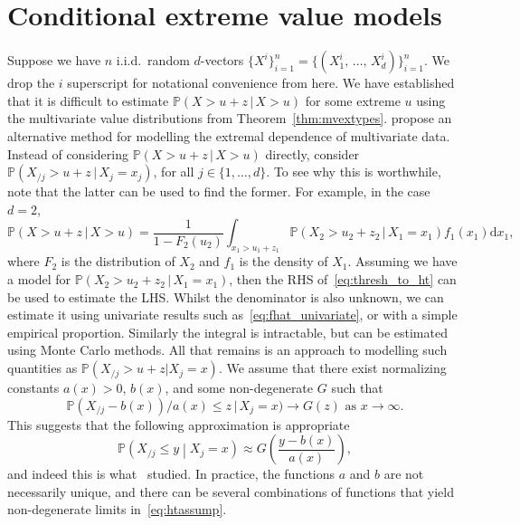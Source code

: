 \documentclass[11pt,twoside,openany]{book}
\newcommand{\prob}{\mathbb{P}}
\newcommand{\md}{\mathrm{d}}
\numberwithin{Theorem}{chapter}
\numberwithin{Definition}{chapter}
\numberwithin{Lemma}{chapter}
\numberwithin{Algorithm}{chapter}
\numberwithin{equation}{chapter}
\begin{document}
\section{Conditional extreme value models}

Suppose we have $n$ i.i.d.\ random $d$-vectors
$\{X^i\}_{i=1}^n = \{(X^i_1,\,\ldots,\,X^i_d)\}_{i=1}^n$.
We drop the $i$ superscript for notational convenience from here. We have
established that it is difficult to estimate $\prob(X > u + z\,|\,X > u)$
for some extreme $u$ using the multivariate value distributions from
Theorem~\ref{thm:mvextypes}. \cite{heffernan2004conditional} propose an
alternative method for modelling the extremal dependence of multivariate data.
Instead of considering $\prob(X> u + z\, |\, X > u)$ directly, consider
$\prob(X_{/j} > u + z\, |\, X_j = x_j)$, for all $j\in \{1,\ldots,d\}$.
To see why this is worthwhile, note that
the latter can be used to find the former. For example, in the case $d=2$,
\begin{equation}\label{eq:thresh_to_ht}
    \prob(X > u + z\,|\,X > u)
  = \frac{1}{1-F_2(u_2)}\int_{x_1 > u_1+z_1} \prob(X_2 > u_2 + z_2\, |\, X_1 =x_1)f_{1}(x_1)\md x_{1},
  \end{equation}
where $F_2$ is the distribution of $X_2$ and $f_1$ is the density
of $X_1$. Assuming we have a model for $\prob(X_2 > u_2 + z_2\, |\, X_1 = x_1)$, then the
RHS of~\eqref{eq:thresh_to_ht} can be used to estimate the LHS. Whilst
the denominator is also unknown, we can estimate it
using univariate results such as~\eqref{eq:fhat_univariate}, or with a simple
empirical proportion. Similarly
the integral is intractable, but can be estimated using Monte Carlo methods.
All that remains is an approach to modelling such quantities as
$\prob(X_{/j}> u + z |X_j = x)$. We assume that there exist
normalizing constants $a(x)>0$, $b(x)$, and some non-degenerate $G$ such that
\begin{equation}
  \label{eq:htassump}
  \prob(X_{/j} - b(x))/a(x)\leq z \,|\,X_j = x)\rightarrow G(z) \text{ as } {x\rightarrow\infty}.
\end{equation}
This suggests that the following approximation is appropriate
\begin{equation}
  \label{eq:basichtapprox}
\prob\left(X_{/j}\leq y\middle| X_{j} = x\right)\approx
G\left(\frac{y - b(x)}{a(x)}\right),
\end{equation}
and indeed this is what~\cite{heffernan2004conditional}
studied. In practice,
the functions $a$ and $b$ are not necessarily unique, and there can
be several combinations of functions that yield non-degenerate limits in~\eqref{eq:htassump}.
\end{document}

